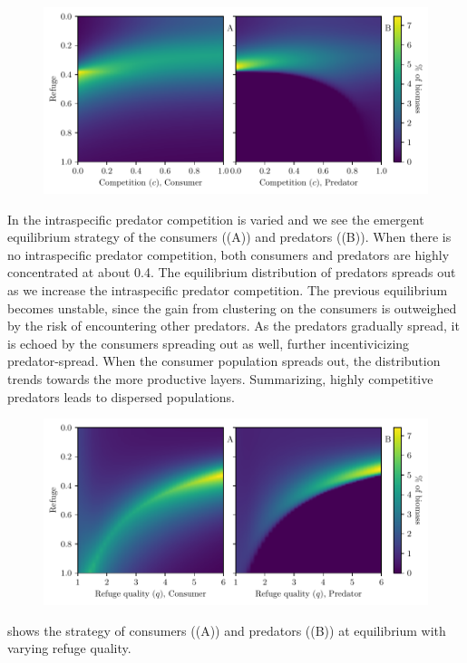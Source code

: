 \begin{figure}[H]
  \begin{centering}
    \includegraphics{plots/increasing_competition_c.pdf}
  \end{centering}
  \label{fig:strat_comp}
\end{figure}
In  the intraspecific predator competition is varied and we see the emergent  equilibrium strategy of the consumers ((A)) and predators ((B)). When there is no intraspecific predator competition, both consumers and predators are highly concentrated at about 0.4. The equilibrium distribution of predators spreads out as we increase the intraspecific predator competition. The previous equilibrium becomes unstable, since the gain from clustering on the consumers is outweighed by the risk of encountering other predators. As the predators gradually spread, it is echoed by the consumers spreading out as well, further incentivicizing predator-spread. When the consumer population spreads out,  the distribution trends towards the more productive layers. Summarizing, highly competitive predators leads to dispersed populations.

\begin{figure}[H]
  \begin{centering}
    \includegraphics{plots/increasing_refuge_quality_c.pdf}
  \end{centering}
  \label{fig:ref_qual}
\end{figure}
 shows the strategy of consumers ((A)) and predators ((B)) at equilibrium with varying refuge quality.
